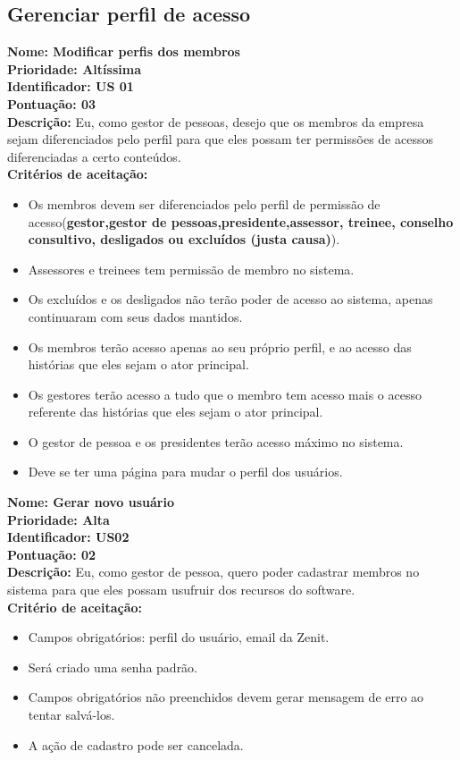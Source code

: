 \begin{anexosenv}
\subsection{Gerenciar perfil de acesso}

\indent \textbf{Nome: Modificar perfis dos membros\\
\indent Prioridade: Altíssima\\
\indent Identificador: US 01\\
\indent Pontuação: 03\\
\indent Descrição:} Eu, como gestor de pessoas, desejo que os membros da empresa sejam diferenciados pelo perfil para que eles possam ter permissões de acessos diferenciadas a certo conteúdos.\\
\indent \textbf{Critérios de aceitação:}
\begin{itemize}
    \item Os membros devem ser diferenciados pelo perfil de permissão de acesso(\textbf{gestor,gestor de pessoas,presidente,assessor, treinee, conselho consultivo, desligados ou excluídos (justa causa)}).
    \item Assessores e treinees tem permissão de membro no sistema.
    \item Os excluídos e os desligados não terão poder de acesso ao sistema, apenas continuaram com seus dados mantidos.
    \item Os membros terão acesso apenas ao seu próprio perfil, e ao acesso das histórias que eles sejam o ator principal.
    \item Os gestores terão acesso a tudo que o membro tem acesso mais o acesso referente das histórias que eles sejam o ator principal.
    \item O gestor de pessoa e os presidentes terão acesso máximo no sistema.
    \item Deve se ter uma página para mudar o perfil dos usuários.
\end{itemize}

\indent \textbf{Nome: Gerar novo usuário\\
\indent Prioridade: Alta\\
\indent Identificador: US02\\
\indent Pontuação: 02\\
\indent Descrição: }Eu, como gestor de pessoa, quero poder cadastrar membros no sistema para que eles possam usufruir dos recursos do software.\\
\indent \textbf{Critério de aceitação:}
\begin{itemize}
    \item Campos obrigatórios: perfil do usuário, email da Zenit.
    \item Será criado uma senha padrão.
    \item Campos obrigatórios não preenchidos devem gerar mensagem de erro ao tentar salvá-los.
    \item A ação de cadastro pode ser cancelada.
\end{itemize}



\end{anexosenv}
